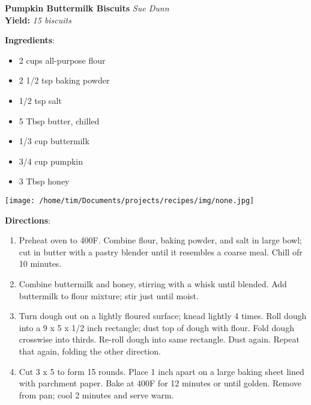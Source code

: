 \documentclass[11pt, twoside, openany]{book}
\begin{document}
\noindent\begin{minipage}[t]{\linewidth}%
{\Large\textbf{Pumpkin Buttermilk Biscuits}} \label{pumpkin-buttermilk-biscuits}\hfill\textit{Sue Dunn}\\
\textbf{Yield:} \textit{15 biscuits}\\
\noindent\begin{minipage}[t]{0.78\linewidth}%
\textbf{Ingredients}:\vspace{-3mm}
\begin{multicols}{2}
\begin{itemize}\setlength\itemsep{-1mm}
\item 2 cups all-purpose flour
\item 2 1/2 tsp baking powder
\item 1/2 tsp salt
\item 5 Tbsp butter, chilled
\item 1/3 cup buttermilk
\item 3/4 cup pumpkin
\item 3 Tbsp honey
\end{itemize}
\end{multicols}
\end{minipage}
\noindent\begin{minipage}[t]{0.18\linewidth}
\centering \strut\vspace*{-\baselineskip}\newline
\texttt{[image: /home/tim/Documents/projects/recipes/img/none.jpg]}\\
\end{minipage}\vspace{3mm}
\textbf{Directions}:
\vspace{-3mm}\begin{enumerate}\setlength\itemsep{-1mm}
\item Preheat oven to 400F. Combine flour, baking powder, and salt in large bowl; cut in butter with a pastry blender until it resembles a coarse meal. Chill ofr 10 minutes.
\item Combine buttermilk and honey, stirring with a whisk until blended. Add buttermilk to flour mixture; stir just until moist.
\item Turn dough out on a lightly floured surface; knead lightly 4 times. Roll dough into a 9 x 5 x 1/2 inch rectangle; dust top of dough with flour. Fold dough crosswise into thirds. Re-roll dough into same rectangle. Dust again. Repeat that again, folding the other direction.
\item Cut 3 x 5 to form 15 rounds. Place 1 inch apart on a large baking sheet lined with parchment paper. Bake at 400F for 12 minutes or until golden. Remove from pan; cool 2 minutes and serve warm.
\end{enumerate}
\end{minipage}\vspace{8mm}
\end{document}
